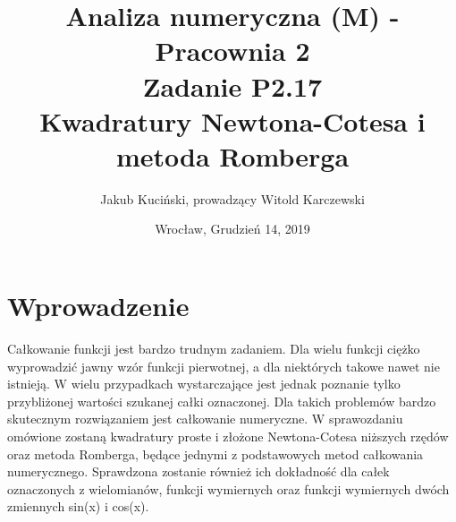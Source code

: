 \documentclass[11pt,wide]{article}
\title{Analiza numeryczna (M) - Pracownia 2 \\ Zadanie P2.17\\
Kwadratury Newtona-Cotesa i metoda Romberga}
\date{Wrocław, Grudzień 14, 2019}
\author{Jakub Kuciński, prowadzący Witold Karczewski}
\begin{document}
\maketitle
\thispagestyle{empty} 
\tableofcontents


\section{Wprowadzenie}
Całkowanie funkcji jest bardzo trudnym zadaniem. Dla wielu funkcji ciężko wyprowadzić jawny wzór funkcji pierwotnej, a dla niektórych takowe nawet nie istnieją. W wielu przypadkach wystarczające jest jednak poznanie tylko przybliżonej wartości szukanej całki oznaczonej. Dla takich problemów bardzo skutecznym rozwiązaniem jest całkowanie numeryczne. W sprawozdaniu omówione zostaną kwadratury proste i złożone Newtona-Cotesa niższych rzędów oraz metoda Romberga, będące jednymi z podstawowych metod całkowania numerycznego. Sprawdzona zostanie również ich dokładność dla całek oznaczonych z wielomianów, funkcji wymiernych oraz funkcji wymiernych dwóch zmiennych sin(x) i cos(x).
\pagebreak
\end{document}
